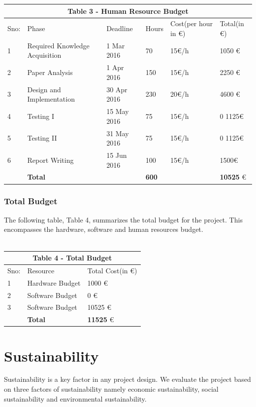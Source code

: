 \begin{tabular}{|p{0.8cm}||p{4cm}|p{2.5cm}|p{1cm}|p{1.5cm}|p{2cm}|}
 \hline
 \multicolumn{6}{|c|}{Table 3 - Human Resource Budget} \\
 \hline
 Sno: & Phase&Deadline &Hours &Cost(per hour in \euro)&Total(in \euro)\\
 \hline
1   & Required Knowledge Acquisition  &1 Mar 2016 &  70  & 15\euro/h & 1050 \euro \\
2   & Paper Analysis  &1 Apr 2016& 150 &  15\euro/h  & 2250 \euro \\
3   & Design and Implementation&30 Apr 2016 &230&  20\euro/h  & 4600 \euro \\
4   & Testing I  &15 May 2016&75 &15\euro/h  & 0 1125\euro \\
5   & Testing II  &31 May 2016&75 &  15\euro/h  & 0 1125\euro \\
6   & Report Writing  &15 Jun 2016&100 &  15\euro/h  & 1500\euro \\
\hline
\hline
   & \textbf{Total}  &  & \textbf{600}&   & \textbf{10525} \euro \\
 \hline
\end{tabular}

\subsubsection{Total Budget}
The following table, Table 4, summarizes the total budget for the project. This encompasses the
hardware, software and human resources budget.
\\ \\ 
\begin{tabular}{|p{1cm}||p{4cm}|p{3cm}|}
 \hline
 \multicolumn{3}{|c|}{Table 4 - Total Budget} \\
 \hline
 Sno: &Resource &Total Cost(in \euro) \\
 \hline
 1   & Hardware Budget  & 1000 \euro \\
 2   & Software Budget  & 0 \euro \\
 3   & Software Budget  & 10525 \euro \\
 \hline
\hline
   & \textbf{Total}  & \textbf{11525} \euro \\
 \hline
 
 

\end{tabular}


\section{Sustainability}
Sustainability is a key factor in any project design. We evaluate the project based on three
factors of sustainability namely economic sustainability, social sustainability and environmental
sustainability.
